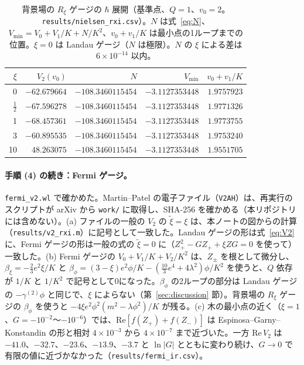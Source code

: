 \documentclass[a4paper,10pt]{ltjsarticle}
\begin{document}
\begin{table}[tbp]
\centering\small
\caption{背景場の $R_\xi$ ゲージの $\hbar$ 展開（基準点、$Q=1$、$v_0=2$。\texttt{results/nielsen\_rxi.csv}）。$N$ は式~\eqref{eq:N}、$V_{\min}=V_0+V_1/K+N/K^2$、$v_0+v_1/K$ は最小点の1ループまでの位置。$\xi=0$ は Landau ゲージ（$N$ は極限）。$N$ の $\xi$ による差は $6\times10^{-14}$ 以内。}
\label{tab:nielsen}
\begin{tabular}{rrrrr}
\toprule
$\xi$ & $V_2(v_0)$ & $N$ & $V_{\min}$ & $v_0+v_1/K$ \\
\midrule
0 & $-62.679664$ & $-108.3460115454$ & $-3.1127353448$ & $1.9757923$ \\
$\frac12$ & $-67.596278$ & $-108.3460115454$ & $-3.1127353448$ & $1.9771326$ \\
1 & $-68.457361$ & $-108.3460115454$ & $-3.1127353448$ & $1.9773755$ \\
3 & $-60.895535$ & $-108.3460115454$ & $-3.1127353448$ & $1.9753240$ \\
10 & $48.263075$ & $-108.3460115454$ & $-3.1127353448$ & $1.9551705$ \\
\bottomrule
\end{tabular}
\end{table}

\paragraph{手順 (4) の続き：Fermi ゲージ。}\texttt{fermi\_v2.wl} で確かめた。Martin--Patel の電子ファイル（\texttt{V2AH}）は、再実行のスクリプトが arXiv から \texttt{work/} に取得し、SHA-256 を確かめる（本リポジトリには含めない）。(a) ファイルの一般の $V_2$ の $\tilde\xi=\xi$ は、本ノートの図からの計算（\texttt{results/v2\_rxi.m}）に記号として一致した。Landau ゲージの形は式~\eqref{eq:V2} に、Fermi ゲージの形は一般の式の $\tilde\xi=0$ に（$Z_+^2-GZ_++\xi ZG=0$ を使って）一致した。(b) Fermi ゲージの $V_0+V_1/K+V_2/K^2$ は、$Z_\pm$ を根として微分し、$\beta_\xi=-\frac23e^2\xi/K$ と $\beta_\phi=(3-\xi)e^2\phi/K-(\frac{10}3e^4+4\lambda^2)\phi/K^2$ を使うと、$Q$ 依存が $1/K$ と $1/K^2$ で記号として0になった。$\beta_\phi$ の2ループの部分は Landau ゲージの $-\gamma^{(2)}\phi$ と同じで、$\xi$ によらない（第~\ref{sec:discussion} 節）。背景場の $R_\xi$ ゲージの $\beta_\phi$ を使うと $-4\xi e^2\phi^2(m^2-\lambda\phi^2)/K$ が残る。(c) 木の最小点の近く（$\xi=1$、$G=-10^{-2}$〜$-10^{-6}$）では、$\mathrm{Re}[f(Z_+)+f(Z_-)]$ は Espinosa--Garny--Konstandin の形と相対 $4\times10^{-3}$ から $4\times10^{-7}$ まで近づいた。一方 $\mathrm{Re}\,V_2$ は $-41.0$、$-32.7$、$-23.6$、$-13.9$、$-3.7$ と $\ln|G|$ とともに変わり続け、$G\to0$ で有限の値に近づかなかった（\texttt{results/fermi\_ir.csv}）。
\end{document}
